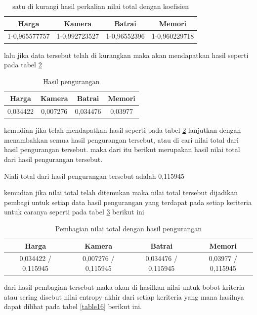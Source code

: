 \begin{table}[h]
\caption{satu di kurangi hasil perkalian nilai total dengan koefisien}
\centering
\begin{tabular}{|c|c|c|c|}
\hline
 Harga & Kamera & Batrai&Memori\\
\hline
1-0,965577757 &1-0,992723527 &1-0,96552396&1-0,960229718\\
\hline
\end{tabular}
\label{table13}
\end{table}

lalu jika data tersebut telah di kurangkan maka akan mendapatkan hasil seperti pada tabel \ref{table14}
\begin{table}[h]
\caption{Hasil pengurangan}
\centering
\begin{tabular}{|c|c|c|c|}
\hline
 Harga & Kamera & Batrai&Memori\\
\hline
0,034422&0,007276 &0,034476&0,03977\\
\hline
\end{tabular}
\label{table14}
\end{table}
kemudian jika telah mendapatkan hasil seperti pada tabel \ref{table14} lanjutkan dengan menambahkan semua hasil pengurangan tersebut, atau di cari nilai total dari hasil pengurangan tersebut. maka dari itu berikut merupakan hasil nilai total dari hasil pengurangan tersebut.\par

Niali total dari hasil pengurangan tersebut adalah 0,115945

kemudian jika nilai total telah ditemukan maka nilai total tersebut dijadikan pembagi untuk setiap data hasil pengurangan yang terdapat pada setiap keriteria untuk caranya seperti pada tabel \ref{table15} berikut ini 
\begin{table}[h]
\caption{Pembagian nilai total dengan hasil pengurangan}
\centering
\begin{tabular}{|c|c|c|c|}
\hline
 Harga & Kamera & Batrai&Memori\\
\hline
0,034422 /
0,115945
&0,007276
/ 0,115945
&0,034476
/ 0,115945
&0,03977
/ 0,115945
\\
\hline
\end{tabular}
\label{table15}
\end{table}
\pagebreak
dari hasil pembagian tersebut maka akan di hasilkan nilai untuk bobot kriteria atau sering disebut nilai entropy akhir dari setiap keriteria yang mana hasilnya dapat dilihat pada tabel \ref{table16} berikut ini. 

